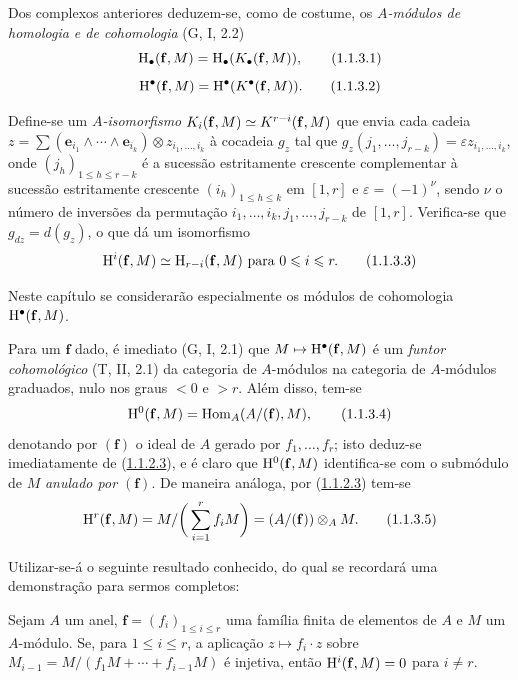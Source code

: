 \begin{env}[1.1.3]
\label{III.1.1.3}
Dos complexos anteriores deduzem-se, como de costume, os \emph{$A$-módulos de homologia e de cohomologia} (G, I, 2.2)
\[
  \mathrm{H}_\bullet(\mathbf{f},M)=\mathrm{H}_\bullet(K_\bullet(\mathbf{f},M)),
  \tag{1.1.3.1}
\]
\[
  \mathrm{H}^\bullet(\mathbf{f},M)=\mathrm{H}^\bullet(K^\bullet(\mathbf{f},M)).
  \tag{1.1.3.2}
\]

Define-se um \emph{$A$-isomorfismo $K_i(\mathbf{f},M)\simeq K^{r-i}(\mathbf{f},M)$} que envia cada cadeia $z=\sum(\mathbf{e}_{i_1}\wedge\cdots\wedge\mathbf{e}_{i_k})\otimes z_{i_1,\dots,i_k}$ à cocadeia $g_z$ tal que $g_z(j_1,\dots,j_{r-k})=\varepsilon z_{i_1,\dots,i_k}$, onde $(j_h)_{1\leq h\leq r-k}$ é a sucessão estritamente crescente complementar à sucessão estritamente crescente $(i_h)_{1\leq h\leq k}$ em $[1,r]$ e $\varepsilon=(-1)^\nu$, sendo $\nu$ o número de inversões da permutação $i_1,\dots,i_k,j_1,\dots,j_{r-k}$ de $[1,r]$.
Verifica-se que $g_{dz}=d(g_z)$, o que dá um isomorfismo
\[
  \HH^i(\mathbf{f},M)\isoto\HH_{r-i}(\mathbf{f},M)\text{ para }0\leq i\leq r.
  \tag{1.1.3.3}\label{III.1.1.3.3}
\]

Neste capítulo se considerarão especialmente os módulos de cohomologia $\mathrm{H}^\bullet(\mathbf{f},M)$.

Para um $\mathbf{f}$ dado, é imediato (G, I, 2.1) que $M\mapsto\HH^\bullet(\mathbf{f},M)$ é um \emph{funtor cohomológico} (T, II, 2.1) da categoria de $A$-módulos na categoria de $A$-módulos graduados, nulo nos graus $<0$ e $>r$.
Além disso, tem-se
\[
  \mathrm{H}^0(\mathbf{f},M)=\operatorname{Hom}_A(A/(\mathbf{f}),M),
  \tag{1.1.3.4}
\]
denotando por $(\mathbf{f})$ o ideal de $A$ gerado por $f_1,\dots,f_r$; isto deduz-se imediatamente de (\hyperref[III.1.1.2.3]{1.1.2.3}), e é claro que $\mathrm{H}^0(\mathbf{f},M)$ identifica-se com o submódulo de $M$ \emph{anulado por $(\mathbf{f})$}.
De maneira análoga, por (\hyperref[III.1.1.2.3]{1.1.2.3}) tem-se
\[
  \HH^r(\mathbf{f},M)=M/\bigg(\sum_{i=1}^r f_i M\bigg)=(A/(\mathbf{f}))\otimes_A M.
  \tag{1.1.3.5}\label{III.1.1.3.5}
\]

Utilizar-se-á o seguinte resultado conhecido, do qual se recordará uma demonstração para sermos completos:
\end{env}

\begin{proposition}[1.1.4]
\label{III.1.1.4}
Sejam $A$ um anel, $\mathbf{f}=(f_i)_{1\leq i\leq r}$ uma família finita de elementos de $A$ e $M$ um $A$-módulo.
Se, para $1\leq i\leq r$, a aplicação $z\mapsto f_i\cdot z$ sobre $M_{i-1}=M/(f_1 M+\cdots+f_{i-1}M)$ é injetiva, então $\mathrm{H}^i(\mathbf{f},M)=0$ para $i\neq r$.
\end{proposition}

